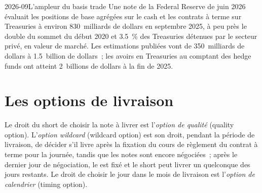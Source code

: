 \begin{dated}{2026-09}{L'ampleur du basis trade}\label{dat:m2:bond-futures:basis}
Une note de la Federal Reserve de juin 2026 évaluait les positions de base agrégées sur le
cash et les contrats à terme sur Treasuries à environ 830~milliards de dollars en septembre 2025,
à peu près le double du sommet du début 2020 et 3.5~\% des Treasuries détenues par le secteur privé, en valeur de marché.
Les estimations publiées vont de 350~milliards de dollars à 1.5~billion de dollars~; les
avoirs en Treasuries au comptant des hedge funds ont atteint 2~billions de dollars à la fin de 2025.
\end{dated}

\section{Les options de livraison}\label{sec:m2:bond-futures:options}

\begin{definition}\label{def:m2:bond-futures:options}
Le droit du short de choisir la note à livrer est l'\emph{option de
qualité} (quality option). L'\emph{option wildcard}
(wildcard option) est son droit, pendant la période de livraison, de décider s'il livre
après la fixation du cours de règlement du contrat à terme pour la journée, tandis que les notes
sont encore négociées~; après le dernier jour de négociation, le  est fixé et le
short peut livrer un quelconque des jours restants. Le droit de choisir le jour
dans le mois de livraison est l'\emph{option de calendrier} (timing option).
\end{definition}

